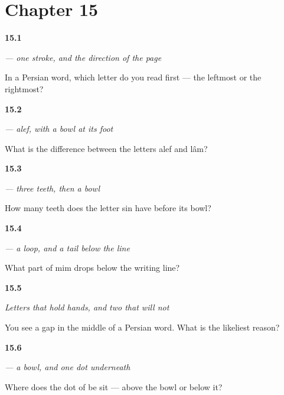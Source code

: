 \section*{Chapter 15}

\noindent\begin{minipage}[t]{\linewidth}
\raggedright
\hypertarget{review-FA-W15-alef-direction}{\textbf{15.1}} \emph{ — one stroke, and the direction of the page}\par
\small In a Persian word, which letter do you read first — the leftmost or the rightmost?
\end{minipage}\par\medskip

\noindent\begin{minipage}[t]{\linewidth}
\raggedright
\hypertarget{review-FA-W15-lam-vs-alef}{\textbf{15.2}} \emph{ — alef, with a bowl at its foot}\par
\small What is the difference between the letters alef and lâm?
\end{minipage}\par\medskip

\noindent\begin{minipage}[t]{\linewidth}
\raggedright
\hypertarget{review-FA-W15-sin-teeth}{\textbf{15.3}} \emph{ — three teeth, then a bowl}\par
\small How many teeth does the letter sin have before its bowl?
\end{minipage}\par\medskip

\noindent\begin{minipage}[t]{\linewidth}
\raggedright
\hypertarget{review-FA-W15-mim-tail}{\textbf{15.4}} \emph{ — a loop, and a tail below the line}\par
\small What part of mim drops below the writing line?
\end{minipage}\par\medskip

\noindent\begin{minipage}[t]{\linewidth}
\raggedright
\hypertarget{review-FA-W15-joining-break}{\textbf{15.5}} \emph{Letters that hold hands, and two that will not}\par
\small You see a gap in the middle of a Persian word. What is the likeliest reason?
\end{minipage}\par\medskip

\noindent\begin{minipage}[t]{\linewidth}
\raggedright
\hypertarget{review-FA-W15-be-dot}{\textbf{15.6}} \emph{ — a bowl, and one dot underneath}\par
\small Where does the dot of be sit — above the bowl or below it?
\end{minipage}\par\medskip

